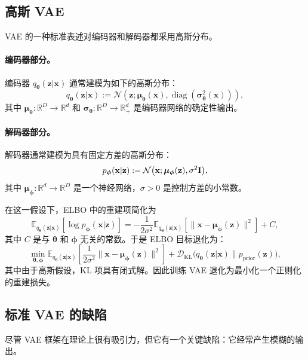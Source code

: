 \subsection{高斯 VAE}\label{subsec:optimization-vae}
VAE 的一种标准表述对编码器和解码器都采用高斯分布。
\paragraph{编码器部分。}
编码器 $ q_{\bm{\theta}}(\mathbf{z} | \mathbf{x}) $ 通常建模为如下的高斯分布：
\[
q_{\bm{\theta}}(\mathbf{z} | \mathbf{x}) := \mathcal{N}\left(\mathbf{z}; \bm{\mu}_{\bm{\theta}}(\mathbf{x}), \operatorname{diag}(\bm{\sigma}_{\bm{\theta}}^2(\mathbf{x}))\right),
\]
其中 $\bm{\mu}_{\bm{\theta}} : \mathbb{R}^D \to \mathbb{R}^d$ 和 $\bm{\sigma}_{\bm{\theta}} : \mathbb{R}^D \to \mathbb{R}_+^d$ 是编码器网络的确定性输出。
\paragraph{解码器部分。} 解码器通常建模为具有固定方差的高斯分布：
\[
p_{\bm{\phi}}(\mathbf{x}|\mathbf{z}) := \mathcal{N}\bigl(\mathbf{x}; \bm{\mu}_{\bm{\phi}}(\mathbf{z}), \sigma^2 {\mathbf{I}}\bigr),
\]
其中 $\bm{\mu}_{\bm{\phi}} : \mathbb{R}^d \to \mathbb{R}^D$ 是一个神经网络，$\sigma > 0$ 是控制方差的小常数。
 
在这一假设下，ELBO 中的重建项简化为
\[
\mathbb{E}_{q_{\bm{\theta}}(\mathbf{z} | \mathbf{x})} \left[\log p_{\bm{\phi}}(\mathbf{x} | \mathbf{z})\right]
= - \frac{1}{2\sigma^2} \mathbb{E}_{q_{\bm{\theta}}(\mathbf{z} | \mathbf{x})} \left[\|\mathbf{x} - \bm{\mu}_{\bm{\phi}}(\mathbf{z})\|^2\right] + C,
\]
其中 $C$ 是与 $\bm{\theta}$ 和 $\bm{\phi}$ 无关的常数。于是 ELBO 目标退化为：
\[
\min_{\bm{\theta}, \bm{\phi}}  \mathbb{E}_{q_{\bm{\theta}}(\mathbf{z} | \mathbf{x})} \left[ \frac{1}{2\sigma^2} \|\mathbf{x} - \bm{\mu}_{\bm{\phi}}(\mathbf{z})\|^2 \right]
+ \mathcal{D}_{\mathrm{KL}}\big(q_{\bm{\theta}}(\mathbf{z} | \mathbf{x}) \| p_{\mathrm{prior}}(\mathbf{z})\big),
\]
其中由于高斯假设，KL 项具有闭式解。因此训练 VAE 退化为最小化一个正则化的重建损失。

\subsection{标准 VAE 的缺陷}\label{sec:drawback_standard_VAE}
尽管 VAE 框架在理论上很有吸引力，但它有一个关键缺陷：它经常产生模糊的输出。

